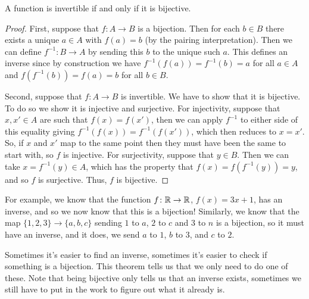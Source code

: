 \documentclass[fleqn]{LectureClass/LectureClass}
\begin{document}
    \begin{thm}{}{}
        A function is invertible if and only if it is bijective.
        \begin{proof}
            First, suppose that \(f \colon A \to B\) is a bijection.
            Then for each \(b \in B\) there exists a unique \(a \in A\) with \(f(a) = b\) (by the pairing interpretation).
            Then we can define \(f^{-1} \colon B \to A\) by sending this \(b\) to the unique such \(a\).
            This defines an inverse since by construction we have \(f^{-1}(f(a)) = f^{-1}(b) = a\) for all \(a \in A\) and \(f(f^{-1}(b)) = f(a) = b\) for all \(b \in B\).
            
            Second, suppose that \(f \colon A \to B\) is invertible.
            We have to show that it is bijective.
            To do so we show it is injective and surjective.
            For injectivity, suppose that \(x, x' \in A\) are such that \(f(x) = f(x')\), then we can apply \(f^{-1}\) to either side of this equality giving \(f^{-1}(f(x)) = f^{-1}(f(x'))\), which then reduces to \(x = x'\).
            So, if \(x\) and \(x'\) map to the same point then they must have been the same to start with, so \(f\) is injective.
            For surjectivity, suppose that \(y \in B\).
            Then we can take \(x = f^{-1}(y) \in A\), which has the property that \(f(x) = f(f^{-1}(y)) = y\), and so \(f\) is surjective.
            Thus, \(f\) is bijective.
        \end{proof}
    \end{thm}
    
    For example, we know that the function \(f \colon \mathbb{R} \to \mathbb{R}\), \(f(x) = 3x + 1\), has an inverse, and so we now know that this is a bijection!
    Similarly, we know that the map \(\{1, 2, 3\} \to \{a, b, c\}\) sending \(1\) to \(a\), \(2\) to \(c\) and \(3\) to \(n\) is a bijection, so it must have an inverse, and it does, we send \(a\) to \(1\), \(b\) to \(3\), and \(c\) to \(2\).
    
    Sometimes it's easier to find an inverse, sometimes it's easier to check if something is a bijection.
    This theorem tells us that we only need to do one of these.
    Note that being bijective only tells us that an inverse exists, sometimes we still have to put in the work to figure out what it already is.
    
\end{document}
